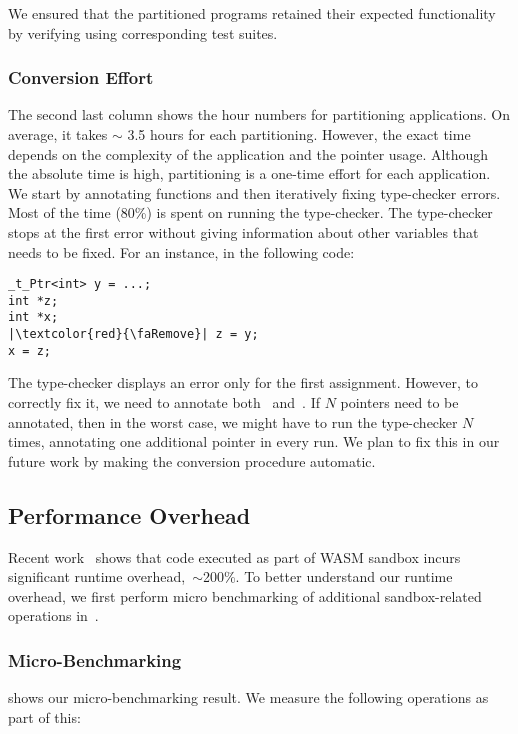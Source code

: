 We ensured that the partitioned programs retained their expected functionality by verifying using corresponding test suites.

\subsubsection{Conversion Effort}
The second last column shows the hour numbers for partitioning applications.
On average, it takes $\sim$ 3.5 hours for each partitioning. However, the exact time depends on the complexity of the application and the pointer usage.
Although the absolute time is high, partitioning is a one-time effort for each application.
We start by annotating functions and then iteratively fixing type-checker errors.
Most of the time (80\%) is spent on running the type-checker.
The type-checker stops at the first error without giving information about other variables that needs to be fixed. 
For an instance, in the following code:
\begin{verbatim}
_t_Ptr<int> y = ...; 
int *z;
int *x;
|\textcolor{red}{\faRemove}| z = y;
x = z;
\end{verbatim}
The type-checker displays an error only for the first assignment.
However, to correctly fix it, we need to annotate both~ and~.
If $N$ pointers need to be annotated, then in the worst case, we might have to run the type-checker $N$ times, annotating one additional pointer in every run.
We plan to fix this in our future work by making the conversion procedure automatic.

\subsection{Performance Overhead}
Recent work~\cite{jangda2019not} shows that code executed as part of WASM sandbox incurs significant runtime overhead,~\ie$\sim$200\%.
To better understand our runtime overhead, we first perform micro benchmarking of additional sandbox-related operations in~\systemname{}.

\subsubsection{Micro-Benchmarking}
 shows our micro-benchmarking result.
We measure the following operations as part of this:

